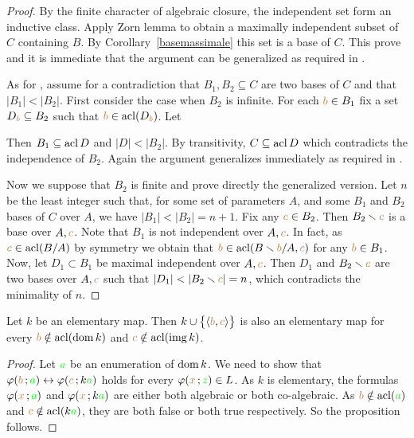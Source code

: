 \begin{proof}
By the finite character of algebraic closure, the independent set form an inductive class. Apply Zorn lemma to obtain a maximally independent subset of $C$ containing $B$. By Corollary~\ref{basemassimale} this set is a base of $C$. This prove  and it is immediate that the argument can be generalized as required in .

As for , assume for a contradiction that $B_1,B_2\subseteq C$ are two bases of $C$ and that $|B_1|<|B_2|$. First consider the case when $B_2$ is infinite. For each ${\color{brown} b}\in B_1$ fix a  set $D_{\color{brown} b}\subseteq B_2$ such that ${\color{brown} b}\in\mathop{\rm acl}(D_{\color{brown} b})$. Let


Then $B_1\subseteq\mathop{\rm acl} D$ and $|D|<|B_2|$. By transitivity, $C\subseteq\mathop{\rm acl} D$ which contradicts the independence of $B_2$. Again the argument generalizes immediately as required in .

Now we suppose that $B_2$ is finite and prove directly the generalized version. Let $n$ be the least integer such that, for some set of parameters $A$, and some $B_1$ and $B_2$ bases of $C$ over $A$, we have $|B_1|<|B_2|=n+1$. Fix any ${\color{brown} c}\in B_2$. Then $B_2\smallsetminus{\color{brown}c}$ is a base over $A,{\color{brown} c}$. Note that $B_1$ is not independent over $A,{\color{brown} c}$. In fact, as ${\color{brown} c}\in\mathop{\rm acl}(B/A)$ by symmetry we obtain that ${\color{brown} b}\in\mathop{\rm acl}(B\smallsetminus{\color{brown}b}/A,{\color{brown} c})$ for any ${\color{brown} b}\in B_1$. Now, let $D_1\subset B_1$ be maximal independent over $A,{\color{brown} c}$. Then $D_1$ and $B_2\smallsetminus{\color{brown}c}$ are two bases over $A,{\color{brown} c}$ such that $|D_1|<|B_2\sm{\mr c}|=n$, which contradicts the minimality of $n$.
\end{proof}

\begin{proposition}\label{prop_mappetraindipendenti} 
Let $k$ be an elementary map. Then $k\cup\big\{\langle{\color{brown}b},{\color{brown} c}\rangle\big\}$ is also an elementary map for every ${\color{brown} b}\notin\mathop{\rm acl}(\mathop{\rm dom} k)$ and ${\color{brown} c}\notin\mathop{\rm acl}(\mathop{\rm img} k)$.
\end{proposition}
\begin{proof}
Let ${\color{green} a}$ be an enumeration of $\mathop{\rm dom} k$. We need to show that $\varphi({\color{brown} b}\,;{\color{green} a})\leftrightarrow\varphi({\color{brown} c}\,;k{\color{green} a})$ holds for every $\varphi({\color{brown} x}\,;{\color{green} z})\in L$. As $k$ is elementary, the formulas $\varphi({\color{brown} x}\,;{\color{green} a})$ and $\varphi({\color{brown} x}\,;k{\color{green} a})$ are either both algebraic or both co-algebraic. As ${\color{brown} b}\notin\mathop{\rm acl}({\color{green} a})$ and ${\color{brown} c}\notin\mathop{\rm acl}(k{\color{green} a})$, they are both false or both true respectively. So the proposition follows.
\end{proof}

